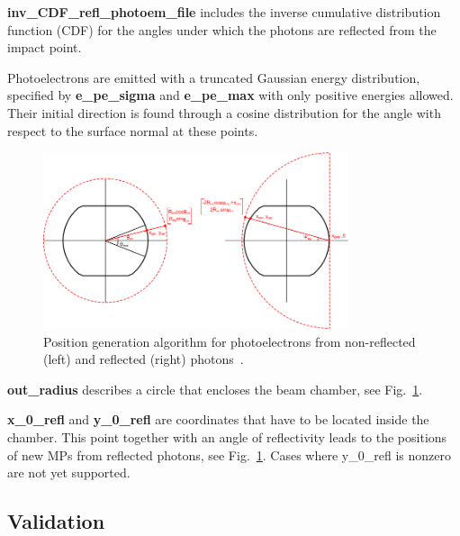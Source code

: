\textbf{inv\_CDF\_refl\_photoem\_file} includes the inverse cumulative distribution function (CDF) for the angles under which the photons are reflected from the impact point.

Photoelectrons are emitted with a truncated Gaussian energy distribution, specified by \textbf{e\_pe\_sigma} and \textbf{e\_pe\_max} with only positive energies allowed.
Their initial direction is found through a cosine distribution for the angle with respect to the surface normal at these points.
\begin{figure}[tbh]
    \centering
    \includegraphics[width=0.8\textwidth]{../ss/gianni_thesis_photoelectrons.png}
    \caption{Position generation algorithm for photoelectrons from non-reflected (left) and reflected (right) photons~\cite{gianni}.}
    \label{fig:gt}
\end{figure}


\textbf{out\_radius} describes a circle that encloses the beam chamber, see Fig.~\ref{fig:gt}.

\textbf{x\_0\_refl} and \textbf{y\_0\_refl} are coordinates that have to be located inside the chamber.
This point together with an angle of reflectivity leads to the positions of new MPs from reflected photons, see Fig.~\ref{fig:gt}.
Cases where y\_0\_refl is nonzero are not yet supported.

\subsection{Validation}

